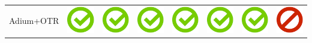 \documentclass[10pt,foldmark,tumble]{leaflet}
\begin{document}
\begin{center}
{{\begin{tabular}{ L{2cm} | C{2cm} | C{2cm} | C{2cm} | C{2cm} | C{2cm} | C{2cm} | C{2cm} }
Adium+OTR & \includegraphics[scale=0.1]{pics/haken.png} & \includegraphics[scale=0.1]{pics/haken.png} & \includegraphics[scale=0.1]{pics/haken.png} & \includegraphics[scale=0.1]{pics/haken.png} & \includegraphics[scale=0.1]{pics/haken.png} & \includegraphics[scale=0.1]{pics/haken.png} & \includegraphics[scale=0.1]{pics/nohaken.png} \tabularnewline

\end{tabular}}}
\end{center}
\end{document}
